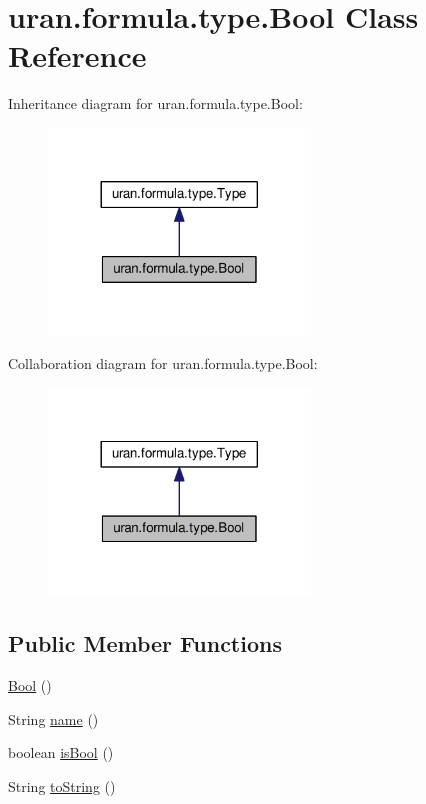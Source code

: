 \hypertarget{classuran_1_1formula_1_1type_1_1_bool}{}\section{uran.\+formula.\+type.\+Bool Class Reference}
\label{classuran_1_1formula_1_1type_1_1_bool}


Inheritance diagram for uran.\+formula.\+type.\+Bool\+:
\nopagebreak
\begin{figure}[H]
\begin{center}
\leavevmode
\includegraphics[width=197pt]{classuran_1_1formula_1_1type_1_1_bool__inherit__graph}
\end{center}
\end{figure}


Collaboration diagram for uran.\+formula.\+type.\+Bool\+:
\nopagebreak
\begin{figure}[H]
\begin{center}
\leavevmode
\includegraphics[width=197pt]{classuran_1_1formula_1_1type_1_1_bool__coll__graph}
\end{center}
\end{figure}
\subsection*{Public Member Functions}
\begin{DoxyCompactItemize}
\item 
\hyperlink{classuran_1_1formula_1_1type_1_1_bool_aa476c4ed0e0023859f4fe28279ac97a1}{Bool} ()
\item 
String \hyperlink{classuran_1_1formula_1_1type_1_1_bool_a7b9d46f551b2a9e84c63476f9805c852}{name} ()
\item 
boolean \hyperlink{classuran_1_1formula_1_1type_1_1_bool_aafddfb259fe050ea4499ae0704c30bed}{is\+Bool} ()
\item 
String \hyperlink{classuran_1_1formula_1_1type_1_1_bool_ab20f47a4bd2f38f47c1d4b4bda13c58f}{to\+String} ()
\end{DoxyCompactItemize}
